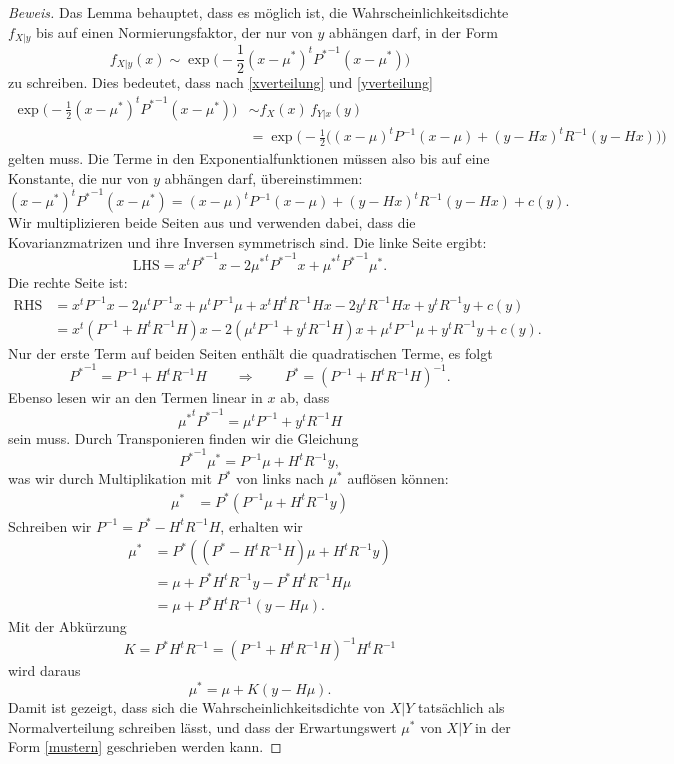 \begin{proof}[Beweis]
Das Lemma behauptet, dass es möglich ist, die Wahrscheinlichkeitsdichte
$f_{X|y}$ bis auf einen Normierungsfaktor, der nur von $y$ abhängen darf,
in der Form
\[
f_{X|y}(x)
\sim
\exp\biggl(
-\frac12 (x-\mu^*)^t{P^*}^{-1}(x-\mu^*)
\biggr)
\]
zu schreiben.
Dies bedeutet, dass nach
\eqref{xverteilung} und \eqref{yverteilung}
\begin{align*}
\exp\biggl(
-\frac12 (x-\mu^*)^t{P^*}^{-1}(x-\mu^*)
\biggr)
&\sim
f_X(x)\, f_{Y|x}(y)
\\
&=
\exp\biggl(
-\frac12\bigl(
(x-\mu)^tP^{-1}(x-\mu)
+
(y-Hx)^tR^{-1}(y-Hx)
\bigr)
\biggr)
\end{align*}
gelten muss.
Die Terme in den Exponentialfunktionen müssen also bis auf eine Konstante,
die nur von $y$ abhängen darf, übereinstimmen:
\[
(x-\mu^*)^t{P^*}^{-1}(x-\mu^*)
=
(x-\mu)^tP^{-1}(x-\mu)
+
(y-Hx)^tR^{-1}(y-Hx)
+c(y).
\]
Wir multiplizieren beide Seiten aus und verwenden dabei, dass die
Kovarianzmatrizen und ihre Inversen symmetrisch sind.
Die linke Seite ergibt:
\[
\text{LHS}
=
x^t{P^*}^{-1}x
-2{\mu^*}^t {P^*}^{-1}x
+{\mu^*}^t{P^*}^{-1}\mu^*.
\]
Die rechte Seite ist:
\begin{align*}
\text{RHS}
&=
x^tP^{-1}x-2\mu^tP^{-1}x+\mu^tP^{-1}\mu+
x^tH^tR^{-1}Hx-2y^tR^{-1}Hx+y^tR^{-1}y+c(y)
\\
&=
x^t(P^{-1}+H^tR^{-1}H)x
-2(\mu^tP^{-1}+y^tR^{-1}H)x
+\mu^tP^{-1}\mu +y^tR^{-1}y+c(y).
\end{align*}
Nur der erste Term auf beiden Seiten enthält die quadratischen Terme, 
es folgt
\[
{P^*}^{-1} = P^{-1}+H^tR^{-1}H
\qquad\Rightarrow\qquad
P^*
=
(P^{-1}+H^tR^{-1}H)^{-1}.
\]
Ebenso lesen wir an den Termen linear in $x$ ab, dass
\[
{\mu^*}^t {P^*}^{-1}
=
\mu^tP^{-1}+y^tR^{-1}H
\]
sein muss.
Durch Transponieren finden wir die Gleichung
\[
{P^*}^{-1}\mu^*
=
P^{-1}\mu + H^tR^{-1}y,
\]
was wir durch Multiplikation mit $P^*$ von links nach $\mu^*$ auflösen
können:
\begin{align*}
\mu^*
&=
P^*( P^{-1}\mu + H^tR^{-1}y)
\end{align*}
Schreiben wir $P^{-1}={P^*}-H^tR^{-1}H$, erhalten wir
\begin{align*}
\mu^*
&=
P^*( ({P^*}-H^tR^{-1}H)
\mu + H^tR^{-1}y)
\\
&=
\mu + P^*H^tR^{-1}y-P^*H^tR^{-1}H\mu
\\
&=
\mu + P^*H^tR^{-1}(y-H\mu).
\end{align*}
Mit der Abkürzung
\begin{equation}
K=P^*H^tR^{-1}
=
(P^{-1}+H^tR^{-1}H)^{-1}H^tR^{-1}
\label{kalman-gain}
\end{equation}
wird daraus
\[
\mu^* = \mu + K(y-H\mu).
\]
Damit ist gezeigt, dass sich die Wahrscheinlichkeitsdichte von $X|Y$
tatsächlich als Normalverteilung schreiben lässt, und dass der Erwartungswert
$\mu^*$ von $X|Y$ in der Form \eqref{mustern} geschrieben werden kann.


\end{proof}
